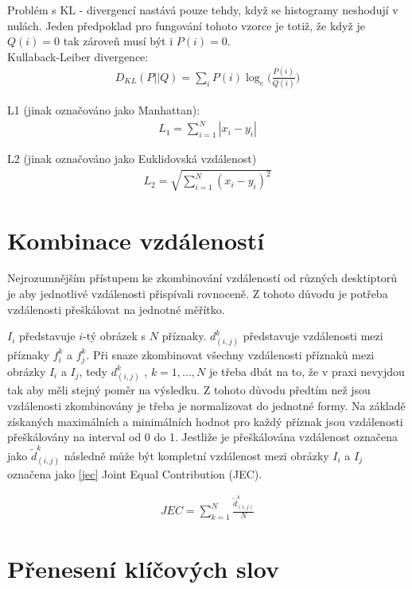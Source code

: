 \documentclass[czech,BP]{thesiskiv}
\begin{document}
Problém s KL - divergencí nastává pouze tehdy, když se histogramy neshodují v nulách. Jeden předpoklad pro fungování tohoto vzorce je totiž, že když je $Q(i) = 0$ tak zároveň musí být i $P(i) = 0$. \\

Kullaback-Leiber divergence:
\begin{align}
   \label{kl}  D_{KL} (P || Q) = \sum_{i} P(i) \log_e \bigg({\frac{P(i)}{Q(i)}} \bigg) 
\end{align}

L1 (jinak označováno jako Manhattan):
\begin{align}
   \label{L1} L_1 = \sum_{i=1}^{N} |x_i - y_i|  
\end{align}

L2 (jinak označováno jako Euklidovská vzdálenost)
\begin{align}
   \label{L2} L_2 = \sqrt{\sum_{i=1}^{N} (x_i - y_i)^2}  
\end{align}
 
\section{Kombinace vzdáleností}
\par Nejrozumnějším přístupem ke zkombinování vzdáleností od různých desktiptorů je aby jednotlivé vzdálenosti přispívali rovnoceně. Z tohoto důvodu je potřeba vzdálenosti přeškálovat na jednotné měřítko.

\par $I_i$ představuje $i$-tý obrázek s $N$ příznaky. $d_{(i,j)}^k$ představuje vzdálenosti mezi příznaky $f_i^k$ a $f_j^k$. Při snaze zkombinovat všechny vzdálenosti příznaků mezi obrázky $I_i$ a $I_j$, tedy $d_{(i,j)}^k$ , $k=1, ..., N$  je třeba dbát na to, že v praxi nevyjdou tak aby měli stejný poměr na výsledku. Z tohoto důvodu předtím než jsou vzdálenosti zkombinovány je třeba je normalizovat do jednotné formy. Na základě získaných maximálních a minimálních hodnot pro každý příznak jsou vzdálenosti přeškálovány na interval od 0 do 1. Jestliže je přeškálována vzdálenost označena jako ${\tilde{d}_{(i,j)}^k}$ následně může být kompletní vzdálenost mezi obrázky $I_i$ a $I_j$ označena jako \eqref{jec} Joint Equal Contribution (JEC).  

\begin{align}
   \label{jec} JEC = \sum_{k=1}^N\frac{\tilde{d}_{(i,j)}^k}{N}
\end{align}

\section{Přenesení klíčových slov}
\end{document}
